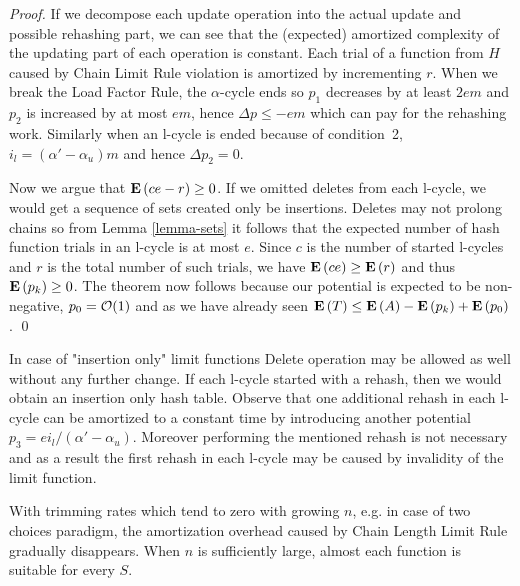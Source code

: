 \begin{proof}
If we decompose each update operation into the actual update and possible rehashing part, we can see that the (expected) amortized complexity of the updating part of each operation is constant. Each trial of a function from $H$ caused by Chain Limit Rule violation is amortized by incrementing $r$. When we break the Load Factor Rule, the $\alpha$-cycle ends so $p_1$ decreases by at least $2em$ and $p_2$ is increased by at most $em$, hence $\Delta p \leq -em$ which can pay for the rehashing work. Similarly when an l-cycle is ended because of condition~2, $i_l = (\alpha' - \alpha_u)m$ and hence $\Delta p_2 = 0$. 

Now we argue that $\mathbf{E}\left(ce - r\right) \geq 0$. If we omitted deletes from each l-cycle, we would get a sequence of sets created only be insertions. Deletes may not prolong chains so from Lemma \ref{lemma-sets} it follows that the expected number of hash function trials in an l-cycle is at most $e$. Since $c$ is the number of started l-cycles and $r$ is the total number of such trials, we have $\mathbf{E}\left(ce\right) \geq \mathbf{E}\left(r\right)$ and thus $\mathbf{E}\left(p_k\right) \geq 0$. The theorem now follows because our potential is expected to be non-negative, $p_0 = \mathcal{O}(1)$ and as we have already seen $\mathbf{E}\left(T\right) \leq \mathbf{E}\left(A\right) - \mathbf{E}\left(p_k\right) + \mathbf{E}\left(p_0\right)$.
\qed
\end{proof}

In case of "insertion only" limit functions Delete operation may be allowed as well without any further change. If each l-cycle started with a rehash, then we would obtain an insertion only hash table. Observe that one additional rehash in each l-cycle can be amortized to a constant time by introducing another potential $p_3 = {ei_{l}}/{(\alpha' - \alpha_u)}$. Moreover performing the mentioned rehash is not necessary and as a result the first rehash in each l-cycle may be caused by invalidity of the limit function.

With trimming rates which tend to zero with growing $n$, e.g. in case of two choices paradigm, the amortization overhead caused by Chain Length Limit Rule gradually disappears. When $n$ is sufficiently large, almost each function is suitable for every $S$.
